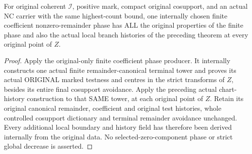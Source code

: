 \begin{theorem}
\label{hir:nc-original-coefficient-phase-local-branch-histories}
\leanok
For original coherent $\mathcal I$, positive mark, compact original cosupport,
and an actual NC carrier with the same highest-count bound, one internally
chosen finite coefficient nonzero-remainder phase has ALL the original
properties of the finite phase and also the actual local branch histories
of the preceding theorem at every original point of $Z$.
\end{theorem}
\begin{proof}
Apply the original-only finite coefficient phase producer. It internally
constructs one actual finite remainder-canonical terminal tower and proves
its actual ORIGINAL marked testness and centres in the strict transforms of
$Z$, besides its entire final cosupport avoidance. Apply the preceding
actual chart-history construction to that SAME tower, at each original
point of $Z$. Retain its original canonical remainder, coefficient and
original test histories, whole controlled cosupport dictionary and terminal
remainder avoidance unchanged. Every additional local boundary and history
field has therefore been derived internally from the original data.
No selected-zero-component phase or strict global decrease is asserted.
\end{proof}
